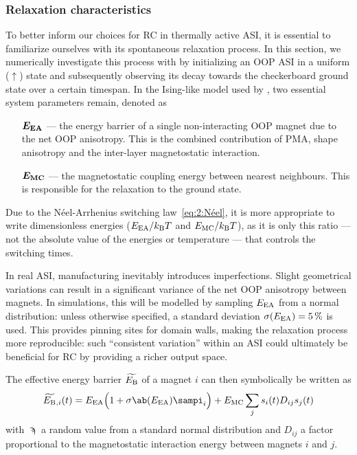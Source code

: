 \subsubsection{Relaxation characteristics}
\label{sec:3:relaxation}
To better inform our choices for RC in thermally active ASI, it is essential to familiarize ourselves with its spontaneous relaxation process.
In this section, we numerically investigate this process with \hotspice by initializing an OOP ASI in a uniform ($\uparrow$) state and subsequently observing its decay towards the checkerboard ground state over a certain timespan.
In the Ising-like model used by \hotspice, two essential system parameters remain, denoted as
\begin{itemize}[leftmargin=4.1em]
	\item[$\boldsymbol{E_\mathrm{EA}}$ ---] the energy barrier of a single non-interacting OOP magnet due to the net OOP anisotropy.
	This is the combined contribution of PMA, shape anisotropy and the inter-layer magnetostatic interaction.
	\item[$\boldsymbol{E_\mathrm{MC}}$ ---] the magnetostatic coupling energy between nearest neighbours.
	This is responsible for the relaxation to the ground state.
\end{itemize}
Due to the N\'eel-Arrhenius switching law~\eqref{eq:2:Néel}, it is more appropriate to write dimensionless energies ($\EEA/\kBT$ and $\EMC/\kBT$), as it is only this ratio --- not the absolute value of the energies or temperature --- that controls the switching times. \par
In real ASI, manufacturing inevitably introduces imperfections.
Slight geometrical variations can result in a significant variance of the net OOP anisotropy between magnets.
In simulations, this will be modelled by sampling $E_\mathrm{EA}$ from a normal distribution: unless otherwise specified, a standard deviation $\sigma(E_\mathrm{EA}) = \SI{5}{\percent}$ is used.
This provides pinning sites for domain walls, making the relaxation process more reproducible: such ``consistent variation'' within an ASI could ultimately be beneficial for RC by providing a richer output space. \par
The effective energy barrier $\widetilde{E_\mathrm{B}}$ of a magnet $i$ can then symbolically be written as
\begin{equation}
	\label{eq:3:OOP_relaxation_EBeff}
	\EBeff{}_{,i}(t) = \EEA \Big(1 + \sigma\ab(\EEA) \sampi_i \Big) + \EMC \sum_j s_i(t) D_{ij} s_j(t)
\end{equation}
with $\sampi$ a random value from a standard normal distribution and $D_{ij}$ a factor proportional to the magnetostatic interaction energy between magnets $i$ and $j$. \\\par

